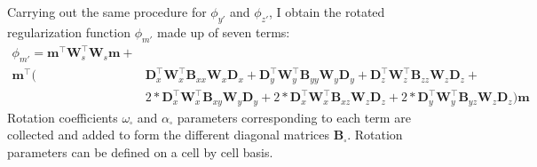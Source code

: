 Carrying out the same procedure for $\phi_{y'}$ and $\phi_{z'}$, I obtain the rotated regularization function $
\phi_{m'}$ made up of seven terms:
\begin{equation}\label{RotatedLiDWO}
\begin{split}
\phi_{m'} = \mathbf{m}^\top \mathbf{W}_s^\top \mathbf{W}_s \mathbf{m} + &\\
\mathbf{m}^\top \bigg(
&\mathbf{D}_x^\top\mathbf{W}_x^\top \mathbf{B}_{xx}\mathbf{W}_x \mathbf{D}_x +
\mathbf{D}_y^\top\mathbf{W}_y^\top \mathbf{B}_{yy}\mathbf{W}_y \mathbf{D}_y +
\mathbf{D}_z^\top\mathbf{W}_z^\top \mathbf{B}_{zz}\mathbf{W}_z \mathbf{D}_z +\\
&2*\mathbf{D}_x^\top \mathbf{W}_x^\top\mathbf{B}_{xy}\mathbf{W}_y \mathbf{D}_y +
2*\mathbf{D}_x^\top \mathbf{W}_x^\top\mathbf{B}_{xz}\mathbf{W}_z \mathbf{D}_z +
2*\mathbf{D}_y^\top \mathbf{W}_y^\top\mathbf{B}_{yz}\mathbf{W}_z \mathbf{D}_z \bigg) \mathbf{m}
\end{split}
\end{equation}
Rotation coefficients $\omega_\square$ and $\alpha_\square$ parameters corresponding to each term are collected and added to form the different diagonal matrices $\mathbf{B}_\square$. Rotation parameters can be defined on a cell by cell basis.

